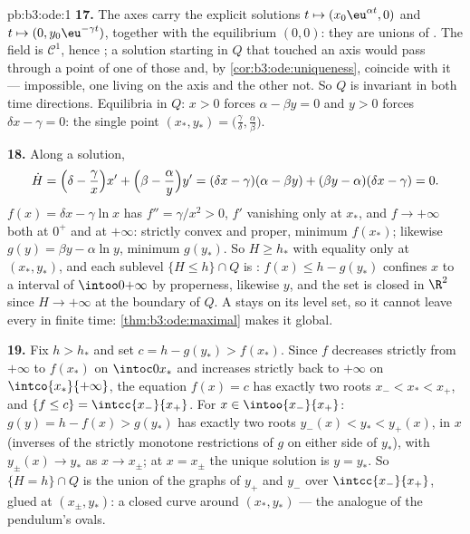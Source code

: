 \begin{solution}{pb:b3:ode:1}
\textbf{17.} The axes carry the explicit solutions $t
\mapsto (x_0\eu^{\alpha t}, 0)$ and $t \mapsto (0,
y_0\eu^{-\gamma t})$, together with the equilibrium
$(0, 0)$: they are unions of . The field is $\mathcal
C^1$, hence ; a solution starting in $Q$
that touched an axis would pass through a point of one of
those  and, by \cref{cor:b3:ode:uniqueness}, coincide
with it --- impossible, one living on the axis and the other
not. So $Q$ is invariant in both time directions.
Equilibria in $Q$: $x > 0$ forces $\alpha - \beta y = 0$ and
$y > 0$ forces $\delta x - \gamma = 0$: the single point
$(x_*, y_*) = \bigl(\frac\gamma\delta,
\frac\alpha\beta\bigr)$.

\textbf{18.} Along a solution,
\[
\dot H = \Bigl(\delta - \frac\gamma x\Bigr)x' +
\Bigl(\beta - \frac\alpha y\Bigr)y'
= (\delta x - \gamma)(\alpha - \beta y) +
(\beta y - \alpha)(\delta x - \gamma) = 0 .
\]
$f(x) = \delta x - \gamma\ln x$ has $f'' = \gamma/x^2 > 0$,
$f'$ vanishing only at $x_*$, and $f \to +\infty$ both at
$0^+$ and at $+\infty$: strictly convex and proper, minimum
$f(x_*)$; likewise $g(y) = \beta y - \alpha\ln y$, minimum
$g(y_*)$. So $H \geq h_*$ with equality only at $(x_*,
y_*)$, and each sublevel $\{H \leq h\}\cap Q$ is :
$f(x) \leq h - g(y_*)$ confines $x$ to a  interval of
$\intoo0{+\infty}$ by properness, likewise $y$, and the set
is closed in $\R^2$ since $H \to +\infty$ at the boundary of
$Q$. A  stays on its  level set, so
it cannot leave every  in finite time:
\cref{thm:b3:ode:maximal} makes it global.

\textbf{19.} Fix $h > h_*$ and set $c = h - g(y_*) >
f(x_*)$. Since $f$ decreases strictly from $+\infty$ to
$f(x_*)$ on $\intoc0{x_*}$ and increases strictly back to
$+\infty$ on $\intco{x_*}{+\infty}$, the equation $f(x) = c$
has exactly two roots $x_- < x_* < x_+$, and $\{f \leq c\} =
\intcc{x_-}{x_+}$. For $x \in \intoo{x_-}{x_+}$: $g(y) = h -
f(x) > g(y_*)$ has exactly two roots $y_-(x) < y_* <
y_+(x)$,  in $x$ (inverses of the strictly
monotone  restrictions of $g$ on either side of
$y_*$), with $y_\pm(x) \to y_*$ as $x \to x_\pm$; at $x =
x_\pm$ the unique solution is $y = y_*$. So $\{H = h\}\cap
Q$ is the union of the graphs of $y_+$ and $y_-$ over
$\intcc{x_-}{x_+}$, glued at $(x_\pm, y_*)$: a closed curve
around $(x_*, y_*)$ --- the analogue of the pendulum's
ovals.


\end{solution}
